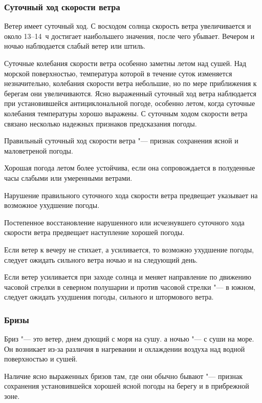 \subsubsection{Суточный ход скорости ветра}

Ветер имеет суточный ход. С восходом солнца скорость ветра
увеличивается и около 13--14~ч достигает наибольшего значения, после
чего убывает. Вечером и ночью наблюдается слабый ветер или штиль.

Суточные колебания скорости ветра особенно заметны летом над
сушей. Над морской поверхностью, температура которой в течение суток
изменяется незначительно, колебания скорости ветра небольшие, но по
мере приближения к берегам они увеличиваются. Ясно выраженный суточный
ход ветра наблюдается при установившейся антициклональной погоде,
особенно летом, когда суточные колебания температуры хорошо
выражены. С суточным ходом скорости ветра связано несколько надежных
признаков предсказания погоды.

 Правильный суточный ход скорости ветра "--- признак сохранения ясной и маловетреной погоды.

 Хорошая погода летом более устойчива, если она сопровождается
в полуденные часы слабыми или умеренными ветрами.

 Нарушение правильного суточного хода скорости ветра предвещает
указывает на возможное ухудшение погоды.

 Постепенное восстановление нарушенного или исчезнувшего
суточного хода скорости ветра предвещает наступление хорошей погоды.

 Если ветер к вечеру не стихает, а усиливается, то возможно
ухудшение погоды, следует ожидать сильного ветра ночью и на следующий
день.

 Если ветер усиливается при заходе солнца и меняет направление
по движению часовой стрелки в северном полушарии и против часовой
стрелки "--- в южном, следует ожидать ухудшения погоды, сильного и
штормового ветра.

\subsubsection{Бризы}

Бриз "--- это ветер, днем дующий с моря на сушу. а ночью "--- с суши на
море. Он возникает из-за различия в нагревании и охлаждении воздуха
над водной поверхностью и сушей.

 Наличие ясно выраженных бризов там, где они обычно бывают "---
признак сохранения установившейся хорошей ясной погоды на берегу и в
прибрежной зоне.

